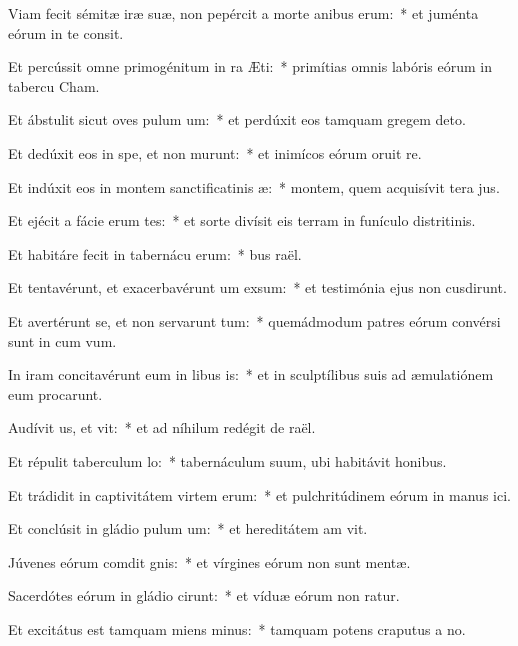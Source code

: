 \item Viam fecit sémitæ iræ suæ, non pepércit a morte anibus erum:~* et juménta eórum in te consit.
\item Et percússit omne primogénitum in ra Æti:~* primítias omnis labóris eórum in tabercu Cham.
\item Et ábstulit sicut oves pulum um:~* et perdúxit eos tamquam gregem  deto.
\item Et dedúxit eos in spe, et non murunt:~* et inimícos eórum oruit re.
\item Et indúxit eos in montem sanctificatinis æ:~* montem, quem acquisívit tera jus.
\item Et ejécit a fácie erum tes:~* et sorte divísit eis terram in funículo distritinis.
\item Et habitáre fecit in tabernácu erum:~* bus raël.
\item Et tentavérunt, et exacerbavérunt um exsum:~* et testimónia ejus non cusdirunt.
\item Et avertérunt se, et non servarunt tum:~* quemádmodum patres eórum convérsi sunt in cum vum.
\item In iram concitavérunt eum in libus is:~* et in sculptílibus suis ad æmulatiónem eum procarunt.
\item Audívit us, et vit:~* et ad níhilum redégit de raël.
\item Et répulit taberculum lo:~* tabernáculum suum, ubi habitávit  honibus.
\item Et trádidit in captivitátem virtem erum:~* et pulchritúdinem eórum in manus ici.
\item Et conclúsit in gládio pulum um:~* et hereditátem am vit.
\item Júvenes eórum comdit gnis:~* et vírgines eórum non sunt mentæ.
\item Sacerdótes eórum in gládio cirunt:~* et víduæ eórum non ratur.
\item Et excitátus est tamquam miens minus:~* tamquam potens craputus a no.

